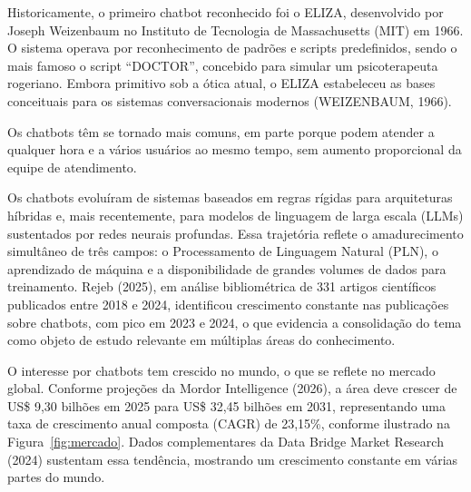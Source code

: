 \documentclass[12pt,a4paper]{extarticle}
\begin{document}
Historicamente, o primeiro chatbot reconhecido foi o ELIZA, desenvolvido por Joseph Weizenbaum no Instituto de Tecnologia de Massachusetts (MIT) em 1966. O sistema operava por reconhecimento de padrões e scripts predefinidos, sendo o mais famoso o script ``DOCTOR'', concebido para simular um psicoterapeuta rogeriano. Embora primitivo sob a ótica atual, o ELIZA estabeleceu as bases conceituais para os sistemas conversacionais modernos (WEIZENBAUM, 1966).

Os chatbots têm se tornado mais comuns, em parte porque podem atender a qualquer hora e a vários usuários ao mesmo tempo, sem aumento proporcional da equipe de atendimento.

Os chatbots evoluíram de sistemas baseados em regras rígidas para arquiteturas híbridas e, mais recentemente, para modelos de linguagem de larga escala (LLMs) sustentados por redes neurais profundas. Essa trajetória reflete o amadurecimento simultâneo de três campos: o Processamento de Linguagem Natural (PLN), o aprendizado de máquina e a disponibilidade de grandes volumes de dados para treinamento. Rejeb (2025), em análise bibliométrica de 331 artigos científicos publicados entre 2018 e 2024, identificou crescimento constante nas publicações sobre chatbots, com pico em 2023 e 2024, o que evidencia a consolidação do tema como objeto de estudo relevante em múltiplas áreas do conhecimento.

O interesse por chatbots tem crescido no mundo, o que se reflete no mercado global. Conforme projeções da Mordor Intelligence (2026), a área deve crescer de US\$ 9,30 bilhões em 2025 para US\$ 32,45 bilhões em 2031, representando uma taxa de crescimento anual composta (CAGR) de 23,15\%, conforme ilustrado na Figura~\ref{fig:mercado}. Dados complementares da Data Bridge Market Research (2024) sustentam essa tendência, mostrando um crescimento constante em várias partes do mundo.

%
\end{document}
